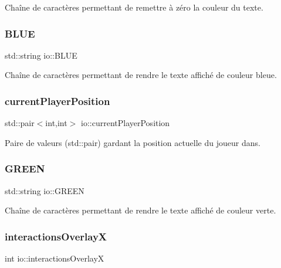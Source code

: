 Chaîne de caractères permettant de remettre à zéro la couleur du texte. 

\mbox{\label{namespaceio_aad76ed62886e76ca53a755d1c917e387}} 
\subsubsection{\texorpdfstring{B\+L\+UE}{BLUE}}
{\footnotesize\ttfamily std\+::string io\+::\+B\+L\+UE}



Chaîne de caractères permettant de rendre le texte affiché de couleur bleue. 

\mbox{\label{namespaceio_a2a0c75ff7760b96fcf6e696efe3d1c51}} 
\subsubsection{\texorpdfstring{current\+Player\+Position}{currentPlayerPosition}}
{\footnotesize\ttfamily std\+::pair$<$int,int$>$ io\+::current\+Player\+Position}



Paire de valeurs (std\+::pair) gardant la position actuelle du joueur dans. 

\mbox{\label{namespaceio_a38fffa22831731f5fc0b72700dc75c87}} 
\subsubsection{\texorpdfstring{G\+R\+E\+EN}{GREEN}}
{\footnotesize\ttfamily std\+::string io\+::\+G\+R\+E\+EN}



Chaîne de caractères permettant de rendre le texte affiché de couleur verte. 

\mbox{\label{namespaceio_a89504a896bab20fea6328b3186d691ae}} 
\subsubsection{\texorpdfstring{interactions\+OverlayX}{interactionsOverlayX}}
{\footnotesize\ttfamily int io\+::interactions\+OverlayX}



